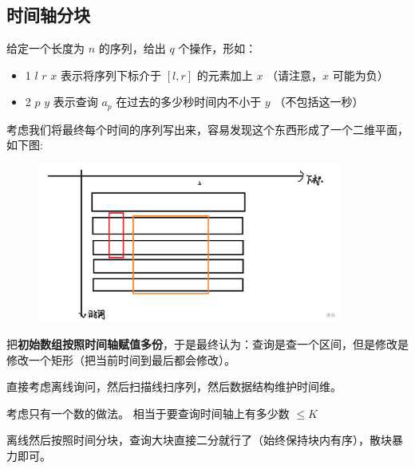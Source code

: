 \subsection{时间轴分块}

\begin{tcolorbox}
\par \noindent 给定一个长度为 $n$ 的序列，给出 $q$ 个操作，形如：

\begin{itemize}
\item 1 $l$ $r$ $x$ 表示将序列下标介于 $[l,r]$ 的元素加上 $x$ （请注意，$x$ 可能为负）
\item 2 $p$ $y$ 表示查询 $a_p$ 在过去的多少秒时间内不小于 $y$ （不包括这一秒）
\end{itemize}
\end{tcolorbox}

\par \noindent 考虑我们将最终每个时间的序列写出来，容易发现这个东西形成了一个二维平面，如下图:
\begin{figure}[H]
        \centering
        \par \includegraphics[width=10cm]{images/time.png}
\end{figure}
\par \noindent 把\textbf{初始数组按照时间轴赋值多份}，于是最终认为：查询是查一个区间，但是修改是修改一个矩形（把当前时间到最后都会修改）。
~\\
\par \noindent 直接考虑离线询问，然后扫描线扫序列，然后数据结构维护时间维。
~\\
\par \noindent 考虑只有一个数的做法。 相当于要查询时间轴上有多少数 $≤K$ 
~\\
\par \noindent 离线然后按照时间分块，查询大块直接二分就行了（始终保持块内有序），散块暴力即可。

